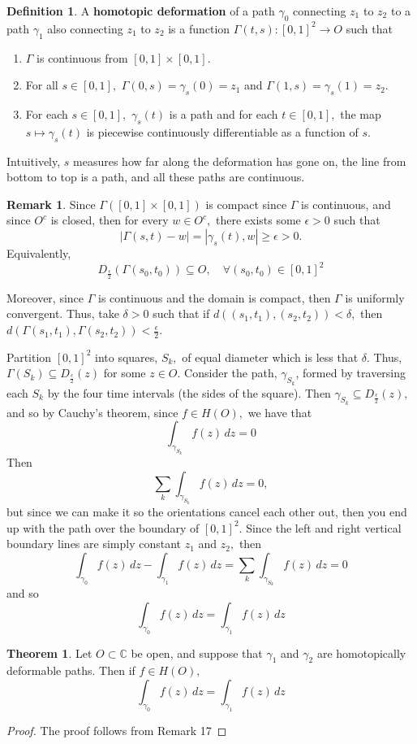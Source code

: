 \documentclass[10pt, oneside]{article}
\newcommand{\bbC}{\mathbb{C}}
\theoremstyle{definition}
\newtheorem{thm}{Theorem}
\newtheorem{defn}{Definition}
\newtheorem{rem}{Remark}
\newcommand{\bbC}{\mathbb{C}}
\begin{document}
\begin{defn}
    A \textbf{homotopic deformation} of a path $\gamma_0$ connecting $z_1$ to $z_2$ to a path $\gamma_1$ also connecting $z_1$ to $z_2$ is a function $\Gamma(t,s): [0,1]^2 \to O$ such that     \begin{enumerate}
        \item $\Gamma$ is continuous from $[0,1]\times [0,1].$
        \item For all $s\in [0,1],$ $\Gamma(0,s) = \gamma_s(0) = z_1$ and $\Gamma(1,s) = \gamma_s(1) = z_2.$
        \item For each $s\in [0,1],$ $\gamma_s(t)$ is a path and for each $t\in [0,1],$ the map $s\mapsto \gamma_s(t)$ is piecewise continuously differentiable as a function of $s.$
    \end{enumerate}
\end{defn}
Intuitively, $s$ measures how far along the deformation has gone on, the line from bottom to top is a path, and all these paths are continuous. 
\begin{rem}
    Since $\Gamma([0,1]\times [0,1])$ is compact since $\Gamma$ is continuous, and since $O^c$ is closed, then for every $w\in O^c,$ there exists some $\epsilon>0$ such that 
    \[|\Gamma(s,t) - w| = |\gamma_s(t), w| \geq \epsilon >0.\]
    Equivalently, 
    \[D_{\frac{\epsilon}{2}}(\Gamma(s_0, t_0)) \subseteq O, \quad \forall (s_0, t_0) \in [0,1]^2\]

    Moreover, since $\Gamma$ is continuous and the domain is compact, then $\Gamma$ is uniformly convergent. Thus, take $\delta>0$ such that if $d((s_1, t_1), (s_2, t_2))< \delta,$ then $d(\Gamma(s_1, t_1), \Gamma(s_2, t_2)) < \frac{\epsilon}{2}.$ 

    Partition $[0,1]^2$ into squares, $S_k,$ of equal diameter which is less that $\delta.$ Thus, $\Gamma(S_k)\subseteq D_{\frac{\epsilon}{2}}(z)$ for some $z \in O.$ Consider the path, $\gamma_{S_k}$,  formed by traversing each $S_k$  by the four time intervals (the sides of the square). Then $\gamma_{S_k}\subseteq D_{\frac{\epsilon}{2}}(z),$ and so by Cauchy's theorem, since $f\in H(O),$ we have that 
    \[\int_{\gamma_{S_k}}f(z)\, dz = 0\] Then 
    \[\sum_k \int_{\gamma_{S_k}}f(z)\, dz = 0,\] but since we can make it so the orientations cancel each other out, then you end up with the path over the boundary of $[0,1]^2.$ Since the left and right vertical boundary lines are simply constant $z_1$ and $z_2,$ then
    \[ \int_{\gamma_0}f(z)\, dz - \int_{\gamma_1} f(z)\, dz= \sum_k \int_{\gamma_{S_k}}f(z)\, dz = 0\] and so
    \[\int_{\gamma_0} f(z)\, dz = \int_{\gamma_1} f(z)\,dz\]
\end{rem}
\begin{thm}
    Let $O\subset \bbC$ be open, and suppose that $\gamma_1$ and $\gamma_2$ are homotopically deformable paths. Then if $f\in H(O),$ 
    \[\int_{\gamma_0} f(z)\, dz = \int_{\gamma_1} f(z)\,dz\]
\end{thm}
\begin{proof}
    The proof follows from Remark 17
\end{proof}
\end{document}
